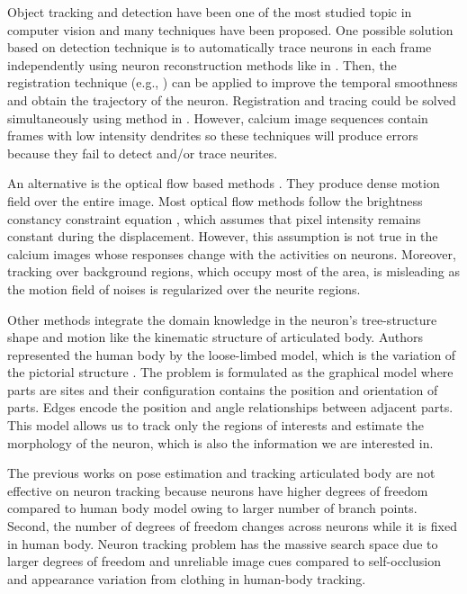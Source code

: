 \documentclass{article}
\begin{document}
Object tracking and detection have been one of the most studied topic in computer vision and many techniques have been proposed. One possible solution based on detection technique is to automatically trace neurons in each frame independently using neuron reconstruction methods like in \cite{Gulyanon2015, Gulyanon2016}. Then, the registration technique (e.g., \cite{Farhand2016}) can be applied to improve the temporal smoothness and obtain the trajectory of the neuron. Registration and tracing could be solved simultaneously using method in \cite{Glowacki2017}. However, calcium image sequences contain frames with low intensity dendrites so these techniques will produce errors because they fail to detect and/or trace neurites.

An alternative is the optical flow based methods \cite{Chen2016, Bailer2017}. They produce dense motion field over the entire image. Most optical flow methods follow the brightness constancy constraint equation \cite{Fortun2015}, which assumes that pixel intensity remains constant during the displacement. However, this assumption is not true in the calcium images whose responses change with the activities on neurons. Moreover, tracking over background regions, which occupy most of the area, is misleading as the motion field of noises is regularized over the neurite regions.

Other methods \cite{Sigal2004, Han2005} integrate the domain knowledge in the neuron's tree-structure shape and motion like the kinematic structure of articulated body. Authors represented the human body by the loose-limbed model, which is the variation of the pictorial structure \cite{Fischler1973, Felzenszwalb2005}. The problem is formulated as the graphical model where parts are sites and their configuration contains the position and orientation of parts. Edges encode the position and angle relationships between adjacent parts. This model allows us to track only the regions of interests and estimate the morphology of the neuron, which is also the information we are interested in.

The previous works on pose estimation and tracking articulated body are not effective on neuron tracking because neurons have higher degrees of freedom compared to human body model owing to larger number of branch points. Second, the number of degrees of freedom changes across neurons while it is fixed in human body. Neuron tracking problem has the massive search space due to larger degrees of freedom and unreliable image cues compared to self-occlusion and appearance variation from clothing in human-body tracking. 
\end{document}
